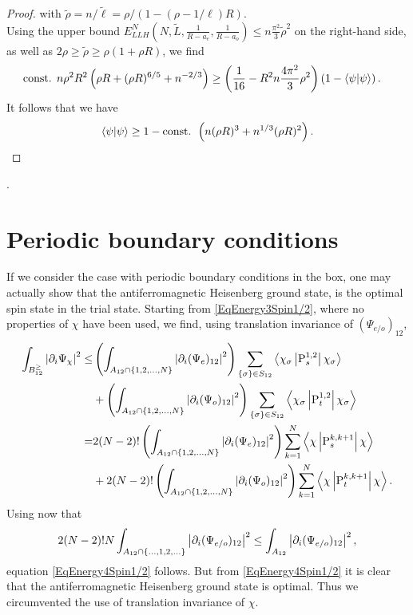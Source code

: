 \begin{proof}
	with $ \tilde{\rho}=n/\tilde{\ell}=\rho/(1-(\rho-1/\ell)R)$.\\
	Using the upper bound $ E_{LLH}^N \left(N,\tilde{L},\frac{1}{R-a_e},\frac{1}{R-a_o}\right)\leq n\frac{\pi^2}{3}\tilde{\rho}^2 $ on the right-hand side, as well as $ 2\rho \geq\tilde{\rho}\geq \rho(1+\rho R)$, we find
	\begin{equation}
	\begin{aligned}
	\text{const. }n\rho^2R^2\left(\rho R+(\rho R)^{6/5}+n^{-2/3}\right)&\geq \left(\frac{1}{16}-R^2n\frac{4\pi^2}{3}\rho^2\right)\left(1-\left\langle\psi|\psi\right\rangle\right).
	\end{aligned}
	\end{equation}
	It follows that we have \begin{equation}
	\left\langle\psi|\psi\right\rangle\geq 1-\text{const. }\left(n(\rho R)^3+n^{1/3}(\rho R)^2\right).
	\end{equation}
\end{proof}.



\appendix
\chapter{Periodic boundary conditions}
\label{AppendixPeriodicBCSpin1/2}
If we consider the case with periodic boundary conditions in the box, one may actually show that the antiferromagnetic Heisenberg ground state, is the optimal spin state in the trial state. Starting from \eqref{EqEnergy3Spin1/2}, where no properties of $ \chi $ have been used, we find, using translation invariance of $ (\Psi_{e/o})_{12} $,
\begin{equation}\label{EqPeriodicUpperBound1}
\begin{aligned}
\int_{B_{12}^{\geq}}\left\lvert \partial_i\Psi_{\chi} \right\rvert^2\leq&\left(\int_{A_{12}\cap\{1,2,\ldots,N\}}\left\lvert \partial_i(\Psi_e)_{12} \right\rvert^2\right)\sum_{\{\sigma\}\in S_{12}}\left\langle\chi_{\sigma} \left\lvert \operatorname{P}^{1,2}_s  \right\rvert \chi_\sigma\right\rangle\\
&+\left(\int_{A_{12}\cap \{1,2,\ldots,N\}}\left\lvert \partial_i(\Psi_o)_{12} \right\rvert^2\right)\sum_{\{\sigma\}\in S_{12}}\left\langle\chi_{\sigma} \left\lvert \operatorname{P}^{1,2}_t  \right\rvert \chi_\sigma\right\rangle\\
=&2(N-2)!\left(\int_{A_{12}\cap\{1,2,\ldots,N\}}\left\lvert \partial_i(\Psi_e)_{12} \right\rvert^2\right)\sum_{k=1}^{N}\left\langle\chi \left\lvert \operatorname{P}^{k,k+1}_s  \right\rvert \chi\right\rangle\\
&+2(N-2)!\left(\int_{A_{12}\cap \{1,2,\ldots,N\}}\left\lvert \partial_i(\Psi_o)_{12} \right\rvert^2\right)\sum_{k=1}^{N}\left\langle\chi \left\lvert \operatorname{P}^{k,k+1}_t  \right\rvert \chi\right\rangle.
\end{aligned}
\end{equation}
Using now that \begin{equation}
2(N-2)!N\int_{A_{12}\cap \{\ldots,1,2,\ldots\}}\left\lvert \partial_i(\Psi_{e/o})_{12} \right\rvert^2\leq \int_{A_{12}}\left\lvert \partial_i(\Psi_{e/o})_{12} \right\rvert^2,
\end{equation}
equation \eqref{EqEnergy4Spin1/2} follows.
But from \eqref{EqEnergy4Spin1/2} it is clear that the antiferromagnetic Heisenberg ground state is optimal. Thus we circumvented the use of translation invariance of $ \chi $.


